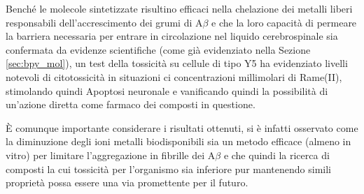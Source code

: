 \documentclass[a4paper, 12pt]{article}
\begin{document}
Benché le molecole sintetizzate risultino efficaci nella chelazione dei metalli liberi responsabili dell’accrescimento dei grumi di A$\beta$ e che la loro capacità di permeare la barriera necessaria per entrare in circolazione nel liquido cerebrospinale sia confermata da evidenze scientifiche (come già evidenziato nella Sezione \ref{sec:bpy_mol}), un test della tossicità su cellule di tipo Y5 ha evidenziato livelli notevoli di citotossicità in situazioni ci concentrazioni millimolari di Rame(II), stimolando quindi Apoptosi neuronale e vanificando quindi la possibilità di un'azione diretta come farmaco dei composti in questione.

È comunque importante considerare i risultati ottenuti, si è infatti osservato come la diminuzione degli ioni metalli biodisponibili sia un metodo efficace (almeno in vitro) per limitare l'aggregazione in fibrille dei A$\beta$ e che quindi la ricerca di composti la cui tossicità per l'organismo sia inferiore pur mantenendo simili proprietà possa essere una via promettente per il futuro. \cite{ji_strategic_2017}




\newpage






\end{document}
